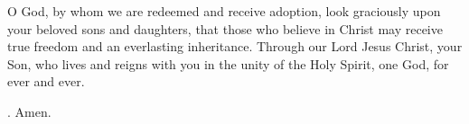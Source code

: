 \lettrine[lines=3]{O}{} God, by whom we are redeemed and receive adoption, 
look graciously upon your beloved sons and daughters,
that those who believe in Christ
may receive true freedom
and an everlasting inheritance.
Through our Lord Jesus Christ, your Son,
who lives and reigns with you in the unity of the Holy Spirit,
one God, for ever and ever. \par \Rbar. Amen.
